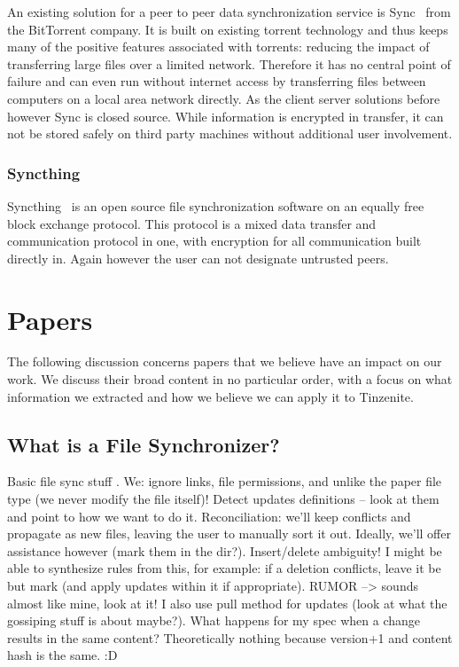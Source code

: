 An existing solution for a peer to peer data synchronization service is Sync~\cite{web:site:bittorrent_sync} from the BitTorrent company.
It is built on existing torrent technology and thus keeps many of the positive features associated with torrents: reducing the impact of transferring large files over a limited network.
Therefore it has no central point of failure and can even run without internet access by transferring files between computers on a local area network directly.
As the client server solutions before however Sync is closed source.
While information is encrypted in transfer, it can not be stored safely on third party machines without additional user involvement.

\subsubsection{Syncthing}
\label{subs:Syncthing}

Syncthing~\cite{web:site:synthing} is an open source file synchronization software on an equally free block exchange protocol.
This protocol is a mixed data transfer and communication protocol in one, with encryption for all communication built directly in.
Again however the user can not designate untrusted peers.

\section{Papers}
\label{sec:Papers}

The following discussion concerns papers that we believe have an impact on our work.
We discuss their broad content in no particular order, with a focus on what information we extracted and how we believe we can apply it to Tinzenite.

\subsection{What is a File Synchronizer?}
\label{sub:What is a File Synchronizer?}

Basic file sync stuff \cite{balasubramaniam1998file}.
We: ignore links, file permissions, and unlike the paper file type (we never modify the file itself)!
Detect updates definitions – look at them and point to how we want to do it.
Reconciliation: we'll keep conflicts and propagate as new files, leaving the user to manually sort it out.
Ideally, we'll offer assistance however (mark them in the dir?).
Insert/delete ambiguity!
I might be able to synthesize rules from this, for example: if a deletion conflicts, leave it be but mark (and apply updates within it if appropriate).
RUMOR --> sounds almost like mine, look at it!
I also use pull method for updates (look at what the gossiping stuff is about maybe?).
What happens for my spec when a change results in the same content?
Theoretically nothing because version+1 and content hash is the same. :D

